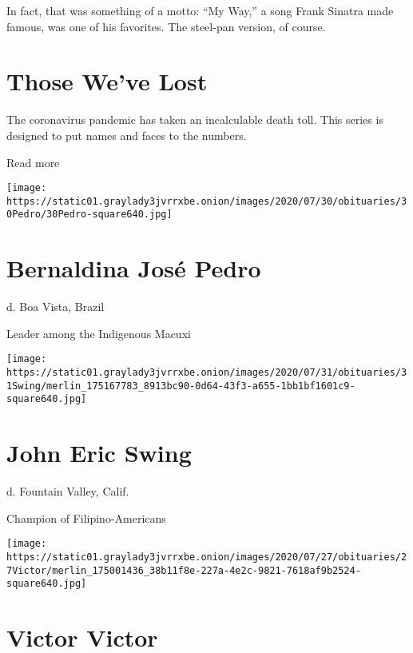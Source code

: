 In fact, that was something of a motto: ``My Way,'' a song Frank Sinatra
made famous, was one of his favorites. The steel-pan version, of course.

\href{https://www.nytimes3xbfgragh.onion/interactive/2020/obituaries/people-died-coronavirus-obituaries.html?action=click\&pgtype=Article\&state=default\&region=BELOW_MAIN_CONTENT\&context=covid_obits_promo}{}

\hypertarget{those-weve-lost}{%
\section{Those We've Lost}\label{those-weve-lost}}

The coronavirus pandemic has taken an incalculable death toll. This
series is designed to put names and faces to the numbers.

Read more

\texttt{[image: https://static01.graylady3jvrrxbe.onion/images/2020/07/30/obituaries/30Pedro/30Pedro-square640.jpg]}

\hypertarget{bernaldina-josuxe9-pedro}{%
\section{Bernaldina José Pedro}\label{bernaldina-josuxe9-pedro}}

d. Boa Vista, Brazil

Leader among the Indigenous Macuxi

\texttt{[image: https://static01.graylady3jvrrxbe.onion/images/2020/07/31/obituaries/31Swing/merlin\_175167783\_8913bc90-0d64-43f3-a655-1bb1bf1601c9-square640.jpg]}

\hypertarget{john-eric-swing}{%
\section{John Eric Swing}\label{john-eric-swing}}

d. Fountain Valley, Calif.

Champion of Filipino-Americans

\texttt{[image: https://static01.graylady3jvrrxbe.onion/images/2020/07/27/obituaries/27Victor/merlin\_175001436\_38b11f8e-227a-4e2c-9821-7618af9b2524-square640.jpg]}

\hypertarget{victor-victor}{%
\section{Victor Victor}\label{victor-victor}}

